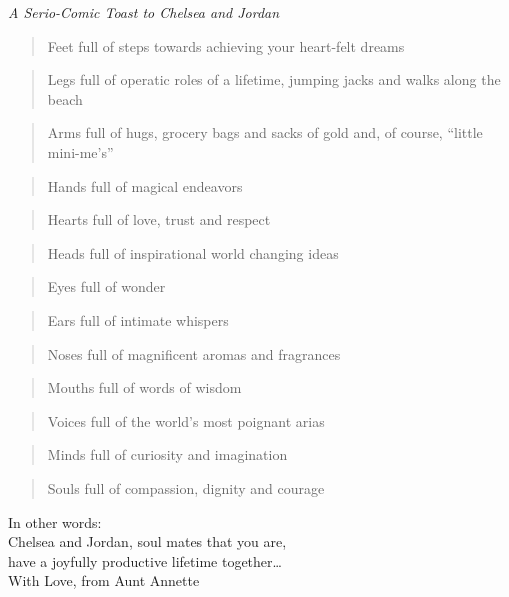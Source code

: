 
{\centering
    \it A Serio-Comic Toast to Chelsea and Jordan\\
}

\bigskip

\begin{verse}
Feet full of steps towards achieving your heart-felt dreams
\end{verse}
\begin{verse}
Legs full of operatic roles of a lifetime, jumping jacks and walks along the beach
\end{verse}
\begin{verse}
Arms full of hugs, grocery bags and sacks of gold \textemdash and, of course, ``little mini-me's''
\end{verse}
\begin{verse}
Hands full of magical endeavors
\end{verse}
\begin{verse}
Hearts full of love, trust and respect
\end{verse}
\begin{verse}
Heads full of inspirational world changing ideas
\end{verse}
\begin{verse}
Eyes full of wonder
\end{verse}
\begin{verse}
Ears full of intimate whispers
\end{verse}
\begin{verse}
Noses full of magnificent aromas and fragrances
\end{verse}
\begin{verse}
Mouths full of words of wisdom
\end{verse}
\begin{verse}
Voices full of the world’s most poignant arias
\end{verse}
\begin{verse}
Minds full of curiosity and imagination
\end{verse}
\begin{verse}
Souls full of compassion, dignity and courage
\end{verse}

{\centering
    In other words:\\
    Chelsea and Jordan, soul mates that you are,\\
    have a joyfully productive lifetime together\ldots\\
    With Love, from Aunt Annette\\
}
